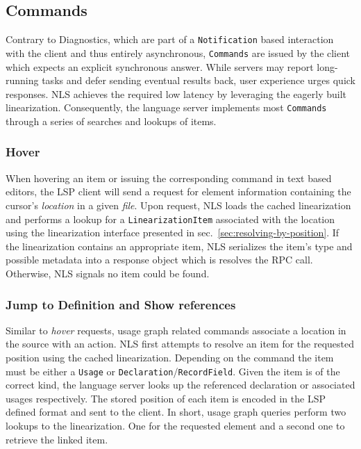 \documentclass[
  a4paper,
  bibtex,
  english,
  nomenclature]{kthlatex/kththesis/kththesis}
\begin{document}
\hypertarget{sec:commands}{%
\subsection{Commands}\label{sec:commands}}

Contrary to Diagnostics, which are part of a \texttt{Notification} based
interaction with the client and thus entirely asynchronous,
\texttt{Commands} are issued by the client which expects an explicit
synchronous answer. While servers may report long-running tasks and
defer sending eventual results back, user experience urges quick
responses. NLS achieves the required low latency by leveraging the
eagerly built linearization. Consequently, the language server
implements most \texttt{Commands} through a series of searches and
lookups of items.

\hypertarget{sec:hover-1}{%
\subsubsection{Hover}\label{sec:hover-1}}

When hovering an item or issuing the corresponding command in text based
editors, the LSP client will send a request for element information
containing the cursor's \emph{location} in a given \emph{file}. Upon
request, NLS loads the cached linearization and performs a lookup for a
\texttt{LinearizationItem} associated with the location using the
linearization interface presented in
sec.~\ref{sec:resolving-by-position}. If the linearization contains an
appropriate item, NLS serializes the item's type and possible metadata
into a response object which is resolves the RPC call. Otherwise, NLS
signals no item could be found.

\hypertarget{sec:jump-to-definition-and-show-references}{%
\subsubsection{Jump to Definition and Show
references}\label{sec:jump-to-definition-and-show-references}}

Similar to \emph{hover} requests, usage graph related commands associate
a location in the source with an action. NLS first attempts to resolve
an item for the requested position using the cached linearization.
Depending on the command the item must be either a \texttt{Usage} or
\texttt{Declaration}/\texttt{RecordField}. Given the item is of the
correct kind, the language server looks up the referenced declaration or
associated usages respectively. The stored position of each item is
encoded in the LSP defined format and sent to the client. In short,
usage graph queries perform two lookups to the linearization. One for
the requested element and a second one to retrieve the linked item.
\end{document}
